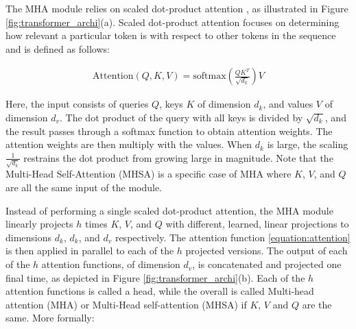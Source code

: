 


The MHA module relies on scaled dot-product attention \cite{vaswani2017attention}, as illustrated in Figure \ref{fig:transformer_archi}(a). Scaled dot-product attention focuses on determining how relevant a particular token is with respect to other tokens in the sequence and is defined as follows:

\begin{align}
\text{Attention}(Q, K, V) = \text{softmax}\left(\frac{QK^T}{\sqrt{d_k}}\right)V
\label{equation:attention}
\end{align}


Here, the input consists of queries $Q$, keys $K$ of dimension $d_k$, and values $V$ of dimension $d_v$. The dot product of the query with all keys is divided by $\sqrt{d_k}$, and the result passes through a softmax function to obtain attention weights. The attention weights are then multiply with the values. When $d_k$ is large, the scaling  $\frac{1}{\sqrt{d_k}}$ restrains the dot product from growing large in magnitude. Note that the Multi-Head Self-Attention (MHSA) is a specific case of MHA where $K$, $V$, and $Q$ are all the same input of the module.

Instead of performing a single scaled dot-product attention, the MHA module linearly projects $h$ times $K$, $V$, and $Q$ with different, learned, linear projections to dimensions $d_k$, $d_k$, and $d_v$ respectively. The attention function \ref{equation:attention} is then applied in parallel to each of the $h$ projected versions. The output of each of the $h$ attention functions, of dimension $d_v$, is concatenated and projected one final time, as depicted in Figure \ref{fig:transformer_archi}(b). Each of the $h$ attention functions is called a head, while the overall is called Multi-head attention (MHA) or Multi-Head self-attention (MHSA) if $K$, $V$ and $Q$ are the same. More formally:

